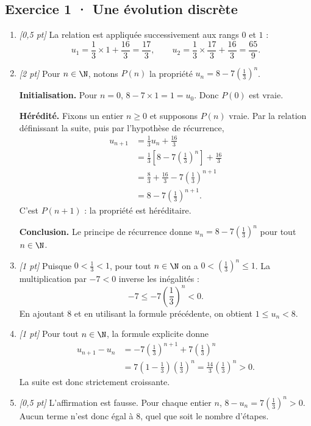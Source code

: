 \subsection*{Exercice 1 · Une évolution discrète}\begin{enumerate}

\item \textit{[0,5 pt]} La relation est appliquée successivement aux rangs $0$ et $1$ :\[u_1=\frac{1}{3}\times 1+\frac{16}{3}=\frac{17}{3},\qquad u_2=\frac{1}{3}\times \frac{17}{3}+\frac{16}{3}=\frac{65}{9}.\]

\item \textit{[2 pt]} Pour $n\in\N$, notons $P(n)$ la propriété $u_n=8-7\left(\frac{1}{3}\right)^n$.
\par\smallskip\textbf{Initialisation.} Pour $n=0$, $8-7\times1=1=u_0$. Donc $P(0)$ est vraie.
\par\smallskip\textbf{Hérédité.} Fixons un entier $n\ge0$ et supposons $P(n)$ vraie. Par la relation définissant la suite, puis par l'hypothèse de récurrence,
\[\begin{aligned}u_{n+1}&=\frac{1}{3}u_n+\frac{16}{3}\\
&=\frac{1}{3}\left[8-7\left(\frac{1}{3}\right)^n\right]+\frac{16}{3}\\
&=\frac{8}{3}+\frac{16}{3}-7\left(\frac{1}{3}\right)^{n+1}\\
&=8-7\left(\frac{1}{3}\right)^{n+1}.
\end{aligned}\]
C'est $P(n+1)$ : la propriété est héréditaire.
\par\smallskip\textbf{Conclusion.} Le principe de récurrence donne $u_n=8-7\left(\frac{1}{3}\right)^n$ pour tout $n\in\N$.

\item \textit{[1 pt]} Puisque $0<\frac{1}{3}<1$, pour tout $n\in\N$ on a $0<(\frac{1}{3})^n\le1$. La multiplication par $-7<0$ inverse les inégalités :
\[-7\le-7(\frac{1}{3})^n<0.\]
En ajoutant $8$ et en utilisant la formule précédente, on obtient $1\le u_n<8$.

\item \textit{[1 pt]} Pour tout $n\in\N$, la formule explicite donne
\[\begin{aligned}u_{n+1}-u_n&=-7(\frac{1}{3})^{n+1}+7(\frac{1}{3})^n\\&=7(1-\frac{1}{3})(\frac{1}{3})^n=\frac{14}{3}(\frac{1}{3})^n>0.\end{aligned}\]
La suite est donc strictement croissante.

\item \textit{[0,5 pt]} L'affirmation est fausse. Pour chaque entier $n$, $8-u_n=7(\frac{1}{3})^n>0$. Aucun terme n'est donc égal à $8$, quel que soit le nombre d'étapes.

\end{enumerate}

